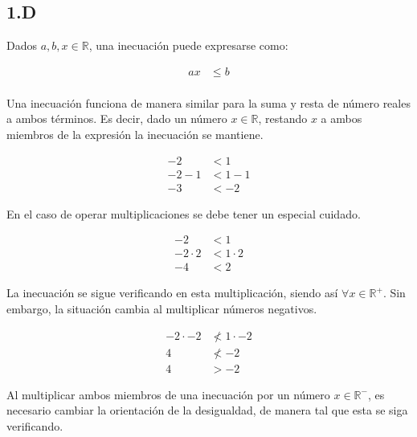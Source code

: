 \subsection*{1.D}

Dados $a, b, x \in \mathbb{R}$, una inecuación puede expresarse como:

\begin{align*}
	ax &\leq b\\
\end{align*}

Una inecuación funciona de manera similar para la suma y resta de número reales a ambos términos. Es decir, dado un número $x \in \mathbb{R}$, restando $x$ a ambos miembros de la expresión la inecuación se mantiene.

\begin{align*}
	-2 &< 1\\
	-2 - 1 &< 1 - 1\\
	-3 &< -2
\end{align*}

En el caso de operar multiplicaciones se debe tener un especial cuidado.

\begin{align*}
	-2 &< 1\\
	-2 \cdot 2 &< 1 \cdot 2\\
	-4 &< 2
\end{align*}

La inecuación se sigue verificando en esta multiplicación, siendo así $\forall x \in \mathbb{R^+}$. Sin embargo, la situación cambia al multiplicar números negativos.

\begin{align*}
	-2 \cdot -2 &\not < 1 \cdot -2\\
	4 &\not < -2\\
	4 &> -2
\end{align*}

Al multiplicar ambos miembros de una inecuación por un número $x \in \mathbb{R^-}$, es necesario cambiar la orientación de la desigualdad, de manera tal que esta se siga verificando.
